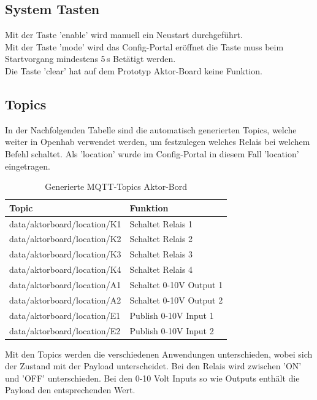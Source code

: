 \subsection{System Tasten}
Mit der Taste 'enable' wird manuell ein Neustart durchgeführt. \\
Mit der Taste 'mode' wird das Config-Portal eröffnet die Taste muss beim Startvorgang mindestens 5\,s Betätigt werden.\\
Die Taste 'clear' hat auf dem Prototyp Aktor-Board keine Funktion.

\subsection{Topics}
In der Nachfolgenden Tabelle sind die automatisch generierten Topics, welche weiter in Openhab verwendet werden, um festzulegen welches Relais bei welchem Befehl schaltet. Als 'location' wurde im Config-Portal in diesem Fall 'location' eingetragen.
\begin{table}[H]
	\centering
	\begin{tabular}{|l|l|}
		\hline 
		 Topic  & Funktion  \\ 
		\hline 
		data/aktorboard/location/K1 & Schaltet Relais 1  \\ 
		\hline
		data/aktorboard/location/K2 & Schaltet Relais 2  \\ 
		\hline
		data/aktorboard/location/K3 & Schaltet Relais 3  \\ 
		\hline
		data/aktorboard/location/K4 & Schaltet Relais 4  \\ 
		\hline 
		data/aktorboard/location/A1 & Schaltet 0-10V Output 1  \\ 
		\hline
		data/aktorboard/location/A2 & Schaltet 0-10V Output 2  \\ 
		\hline
		data/aktorboard/location/E1 & Publish 0-10V Input 1  \\ 
		\hline
		data/aktorboard/location/E2 & Publish 0-10V Input 2  \\ 
		\hline
	\end{tabular} 	
\caption{Generierte MQTT-Topics Aktor-Bord}
\label{tab: MQTT-Topics Aktor}
\end{table}
 
Mit den Topics werden die verschiedenen Anwendungen unterschieden, wobei sich der Zustand mit der Payload unterscheidet. Bei den Relais wird zwischen 'ON' und 'OFF' unterschieden. Bei den 0-10 Volt Inputs so wie Outputs enthält die Payload den entsprechenden Wert. 
